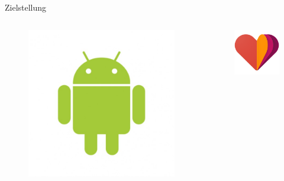 \documentclass[hyphens]{beamer}
\begin{document}
  \begin{frame}{Zielstellung}
 \begin{columns}[T]

\begin{column}{0.34\textwidth}
\begin{figure}
\includegraphics[width=\textwidth]{pics/android-logo.jpg}
\end{figure}
\end{column}
\pause

\begin{column}{0.33\textwidth}
\begin{figure}
\includegraphics[width=\textwidth]{pics/Google-Fit-Icon.png}
\end{figure}
\end{column}
\pause


\end{columns}
\end{frame}
\end{document}

